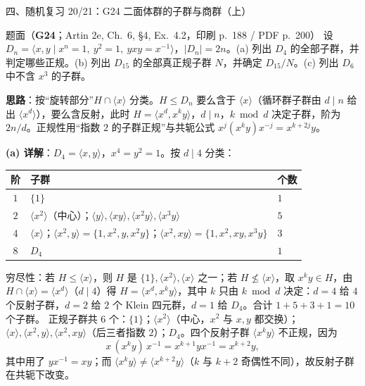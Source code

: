 \documentclass[aspectratio=169,10pt,fontset=none]{ctexbeamer}
\newcommand{\ex}[1]{\textcolor{accent}{\footnotesize\bfseries #1}}
\newcommand{\key}[1]{\textcolor{ink}{\bfseries #1}}
\begin{document}
\begin{frame}[t]{四、随机复习 20/21：G24 二面体群的子群与商群（上）}
\label{ex:G24}
\scriptsize
\begin{block}{\footnotesize 题面（\ex{G24}；Artin 2e, Ch.~6, \S4, Ex.~4.2，印刷 p.~188 / PDF p.~200）}
设 $D_n=\langle x,y\mid x^n=1,\ y^2=1,\ yxy=x^{-1}\rangle$，$|D_n|=2n$。(a) 列出 $D_4$ 的全部子群，并判定哪些正规。(b) 列出 $D_{15}$ 的全部真正规子群 $N$，并确定 $D_{15}/N$。(c) 列出 $D_6$ 中不含 $x^3$ 的子群。
\end{block}
\key{思路}：按“旋转部分”$H\cap\langle x\rangle$ 分类。$H\le D_n$ 要么含于 $\langle x\rangle$（循环群子群由 $d\mid n$ 给出 $\langle x^d\rangle$），要么含反射，此时 $H=\langle x^d,x^ky\rangle$，$d\mid n$，$k\bmod d$ 决定子群，阶为 $2n/d$。正规性用“指数 $2$ 的子群正规”与共轭公式 $x^j(x^ky)x^{-j}=x^{k+2j}y$。

\key{(a) 详解}：$D_4=\langle x,y\rangle$，$x^4=y^2=1$。按 $d\mid4$ 分类：
\begin{center}
{\scriptsize
\begin{tabular}{@{}cll@{}}
\toprule
阶 & 子群 & 个数\\
\midrule
$1$ & $\{1\}$ & $1$\\
$2$ & $\langle x^2\rangle$（中心）；$\langle y\rangle,\langle xy\rangle,\langle x^2y\rangle,\langle x^3y\rangle$ & $5$\\
$4$ & $\langle x\rangle$；$\langle x^2,y\rangle=\{1,x^2,y,x^2y\}$；$\langle x^2,xy\rangle=\{1,x^2,xy,x^3y\}$ & $3$\\
$8$ & $D_4$ & $1$\\
\bottomrule
\end{tabular}}
\end{center}
穷尽性：若 $H\le\langle x\rangle$，则 $H$ 是 $\{1\},\langle x^2\rangle,\langle x\rangle$ 之一；若 $H\not\le\langle x\rangle$，取 $x^ky\in H$，由 $H\cap\langle x\rangle=\langle x^d\rangle$（$d\mid4$）得 $H=\langle x^d,x^ky\rangle$，其中 $k$ 只由 $k\bmod d$ 决定：$d=4$ 给 $4$ 个反射子群，$d=2$ 给 $2$ 个 Klein 四元群，$d=1$ 给 $D_4$。合计 $1+5+3+1=10$ 个子群。
正规子群共 $6$ 个：$\{1\}$；$\langle x^2\rangle$（中心，$x^2$ 与 $x,y$ 都交换）；$\langle x\rangle,\langle x^2,y\rangle,\langle x^2,xy\rangle$（后三者指数 $2$）；$D_4$。四个反射子群 $\langle x^ky\rangle$ 不正规，因为
\[ x\,(x^ky)\,x^{-1}=x^{k+1}yx^{-1}=x^{k+2}y, \]
其中用了 $yx^{-1}=xy$；而 $\langle x^ky\rangle\neq\langle x^{k+2}y\rangle$（$k$ 与 $k+2$ 奇偶性不同），故反射子群在共轭下改变。
\end{frame}
\end{document}
